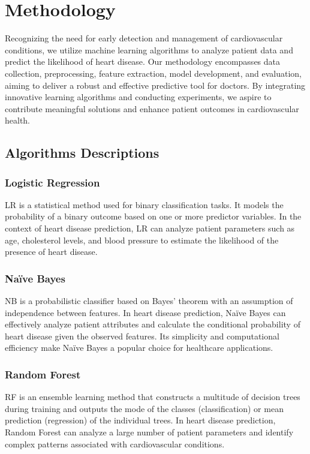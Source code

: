 \chapter{Methodology}
\label{ch:method} %
Recognizing the need for early detection and management of cardiovascular conditions, we utilize machine learning algorithms to analyze patient data and predict the likelihood of heart disease. Our methodology encompasses data collection, preprocessing, feature extraction, model development, and evaluation, aiming to deliver a robust and effective predictive tool for doctors. By integrating innovative learning algorithms and conducting experiments, we aspire to contribute meaningful solutions and enhance patient outcomes in cardiovascular health.

\section{Algorithms Descriptions}
\subsection{Logistic Regression}
LR is a statistical method used for binary classification tasks. It models the probability of a binary outcome based on one or more predictor variables. In the context of heart disease prediction, LR can analyze patient parameters such as age, cholesterol levels, and blood pressure to estimate the likelihood of the presence of heart disease.

\subsection{Naïve Bayes}
NB is a probabilistic classifier based on Bayes' theorem with an assumption of independence between features. In heart disease prediction, Naïve Bayes can effectively analyze patient attributes and calculate the conditional probability of heart disease given the observed features. Its simplicity and computational efficiency make Naïve Bayes a popular choice for healthcare applications.

\subsection{Random Forest}
RF is an ensemble learning method that constructs a multitude of decision trees during training and outputs the mode of the classes (classification) or mean prediction (regression) of the individual trees. In heart disease prediction, Random Forest can analyze a large number of patient parameters and identify complex patterns associated with cardiovascular conditions.


